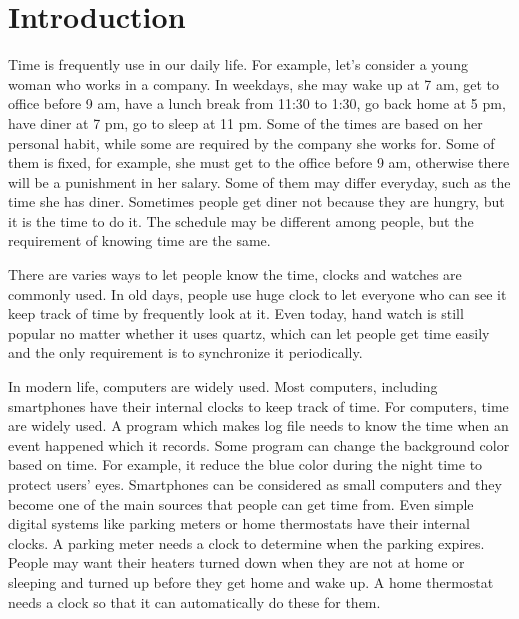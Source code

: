 


\chapter{Introduction}
Time is frequently use in our daily life. For example, let's consider a young
woman who works in a company. In weekdays, she may wake up at 7 am, get to
office before 9 am, have a lunch break from 11:30 to 1:30, go back home at 5
pm, have diner at 7 pm, go to sleep at 11 pm. Some of the times are based on
her personal habit, while some are required by the company she works for.
Some of them is fixed, for example, she must get to the office before 9 am,
otherwise there will be a punishment in her salary. Some of them may differ
everyday, such as the time she has diner. Sometimes people get diner not
because they are hungry, but it is the time to do it. The schedule may be
different among people, but the requirement of knowing time are the same.

There are varies ways to let people know the time, clocks and watches are
commonly used. In old days, people use huge clock to let everyone who can see
it keep track of time by frequently look at it. Even today, hand watch is
still popular no matter whether it uses quartz, which can let people get time
easily and the only requirement is to synchronize it periodically.

In modern life, computers are widely used. Most computers, including
smartphones have their internal clocks to keep track of time. For computers, 
time are widely used. A program which makes log file needs to know the time 
when an event happened which it records. Some program can change the background 
color based on time. For example, it reduce the blue color during the night
time to protect users' eyes. Smartphones can be considered as small computers 
and they become one of the main sources that people can get time from. Even
simple digital systems like parking meters or home thermostats have their
internal clocks. A parking meter needs a clock to determine when the parking
expires. People may want their heaters turned down when they are not at home
or sleeping and turned up before they get home and wake up. A home thermostat
needs a clock so that it can automatically do these for them.


